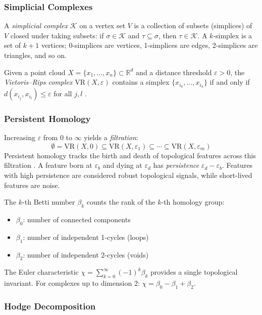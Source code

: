 \documentclass[11pt,a4paper]{article}
\begin{document}
\subsubsection{Simplicial Complexes}

A \emph{simplicial complex} $\mathcal{K}$ on a vertex set $V$ is a collection of subsets (simplices) of $V$ closed under taking subsets: if $\sigma \in \mathcal{K}$ and $\tau \subseteq \sigma$, then $\tau \in \mathcal{K}$.
A $k$-simplex is a set of $k+1$ vertices; 0-simplices are vertices, 1-simplices are edges, 2-simplices are triangles, and so on.

Given a point cloud $X = \{x_1, \ldots, x_n\} \subset \mathbb{R}^d$ and a distance threshold $\varepsilon > 0$, the \emph{Vietoris--Rips complex} $\mathrm{VR}(X, \varepsilon)$ contains a simplex $\{x_{i_0}, \ldots, x_{i_k}\}$ if and only if $d(x_{i_j}, x_{i_l}) \leq \varepsilon$ for all $j, l$ \citep{zomorodian2005computing}.

\subsubsection{Persistent Homology}

Increasing $\varepsilon$ from 0 to $\infty$ yields a \emph{filtration}:
\[
\emptyset = \mathrm{VR}(X, 0) \subseteq \mathrm{VR}(X, \varepsilon_1) \subseteq \cdots \subseteq \mathrm{VR}(X, \varepsilon_m)
\]
Persistent homology tracks the birth and death of topological features across this filtration \citep{edelsbrunner2002topological}.
A feature born at $\varepsilon_b$ and dying at $\varepsilon_d$ has \emph{persistence} $\varepsilon_d - \varepsilon_b$.
Features with high persistence are considered robust topological signals, while short-lived features are noise.

The $k$-th Betti number $\beta_k$ counts the rank of the $k$-th homology group:
\begin{itemize}
  \item $\beta_0$: number of connected components
  \item $\beta_1$: number of independent 1-cycles (loops)
  \item $\beta_2$: number of independent 2-cycles (voids)
\end{itemize}

The Euler characteristic $\chi = \sum_{k=0}^{\infty} (-1)^k \beta_k$ provides a single topological invariant.
For complexes up to dimension 2: $\chi = \beta_0 - \beta_1 + \beta_2$.

\subsubsection{Hodge Decomposition}
\end{document}
